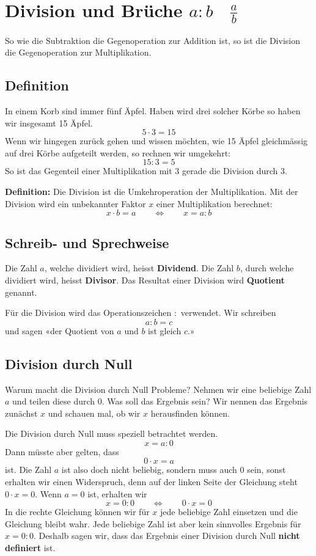 \newpage
\section{Division und Brüche $a:b \quad \tfrac{a}{b}$}

So wie die Subtraktion die Gegenoperation zur Addition ist, so ist die Division die Gegenoperation zur Multiplikation.

\subsection{Definition}

In einem Korb sind immer fünf Äpfel. Haben wird drei solcher Körbe so haben wir insgesamt 15 Äpfel.
\[
  5\cdot 3 = 15
\]
Wenn wir hingegen zurück gehen und wissen möchten, wie 15 Äpfel gleichmässig auf drei
Körbe aufgeteilt werden, so rechnen wir umgekehrt:
\[
  15:3 = 5
\]
So ist das Gegenteil einer Multiplikation mit 3 gerade die Division durch 3.

\textbf{Definition:} Die Division ist die Umkehroperation der Multiplikation. Mit der Division wird ein unbekannter Faktor $x$ einer Multiplikation berechnet:
\[
  x \cdot b=a \qquad\Leftrightarrow\qquad x = a:b
\]

\subsection{Schreib- und Sprechweise}

Die Zahl $a$, welche dividiert wird, heisst \textbf{Dividend}. Die Zahl $b$, durch welche dividiert wird, heisst \textbf{Divisor}. Das Resultat einer Division wird \textbf{Quotient} genannt.

Für die Division wird das Operationszeichen $:$ verwendet. Wir schreiben
\[
  a : b = c
\]
und sagen «der Quotient von $a$ und $b$ ist gleich $c$.»

\subsection{Division durch Null}

Warum macht die Division durch Null Probleme? Nehmen wir eine beliebige Zahl $a$ und teilen diese durch $0$. Was soll das Ergebnis sein? Wir nennen das Ergebnis zunächst $x$ und schauen mal, ob wir $x$ herausfinden können.

Die Division durch Null muss speziell betrachtet werden.
\[
  x = a:0
\]
Dann müsste aber gelten, dass
\[
  0\cdot x = a
\]
ist. Die Zahl $a$ ist also doch nicht beliebig, sondern muss auch $0$ sein, sonst erhalten wir einen Widerspruch, denn auf der linken Seite der Gleichung steht $0\cdot x = 0$. Wenn $a = 0$ ist, erhalten wir
\[
  x = 0:0 \qquad\Leftrightarrow\qquad 0\cdot x = 0
\]
In die rechte Gleichung können wir für $x$ jede beliebige Zahl einsetzen und die Gleichung bleibt wahr. Jede beliebige Zahl ist aber kein sinnvolles Ergebnis für $x = 0 : 0$. Deshalb sagen wir, dass das Ergebnis einer Division durch Null \textbf{nicht definiert} ist.
